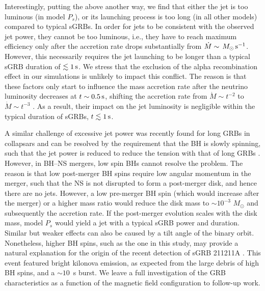 \documentclass[twocolumn,dvipsnames]{aastex62}
\newcommand{\msun}{\,{M_{\odot}}}
\begin{document}
Interestingly, putting the above another way, we find that either the jet is too luminous (in model $ P_s $), or its launching process is too long (in all other models) compared to typical sGRBs. In order for jets to be consistent with the observed jet power, they cannot be too luminous, i.e., they have to reach maximum efficiency only after the accretion rate drops substantially from $ \dot{M} \sim \msun\,{\rm s}^{-1} $. However, this necessarily requires the jet launching to be longer than a typical sGRB duration of $\lesssim 1\,{\rm s}$. We stress that the exclusion of the alpha recombination effect in our simulations is unlikely to impact this conflict. The reason is that these factors only start to influence the mass accretion rate after the neutrino luminosity decreases at $ t \sim 0.5\,{\rm s}$, shifting the accretion rate from $ \dot{M} \sim t^{-2} $ to $ \dot{M} \sim t^{-3} $ \citep{Haddadi2023}. As a result, their impact on the jet luminosity is negligible within the typical duration of sGRBs, $ t \lesssim 1\,{\rm s}$.

A similar challenge of excessive jet power was recently found for long GRBs in collapsars and can be resolved by the requirement that the BH is slowly spinning, such that the jet power is reduced to reduce the tension with that of long GRBs \citep{Gottlieb2023a}. However, in BH--NS mergers, low spin BHs cannot resolve the problem. The reason is that low post-merger BH spins require low angular momentum in the merger, such that the NS is not disrupted to form a post-merger disk, and hence there are no jets. However, a low pre-merger BH spin (which would increase after the merger) or a higher mass ratio would reduce the disk mass to $ \sim 10^{-3}\,\msun $ and subsequently the accretion rate. If the post-merger evolution scales with the disk mass, model $ P_s $ would yield a jet with a typical sGRB power and duration. Similar but weaker effects can also be caused by a tilt angle of the binary orbit. Nonetheless, higher BH spins, such as the one in this study, may provide a natural explanation for the origin of the recent detection of sGRB 211211A \citep[e.g.,][]{Rastinejad2022,Troja2022,Yang2022}. This event featured bright kilonova emission, as expected from the large debris of high BH spins, and a $ \sim 10 $~s burst. We leave a full investigation of the GRB characteristics as a function of the magnetic field configuration to follow-up work.
\end{document}
